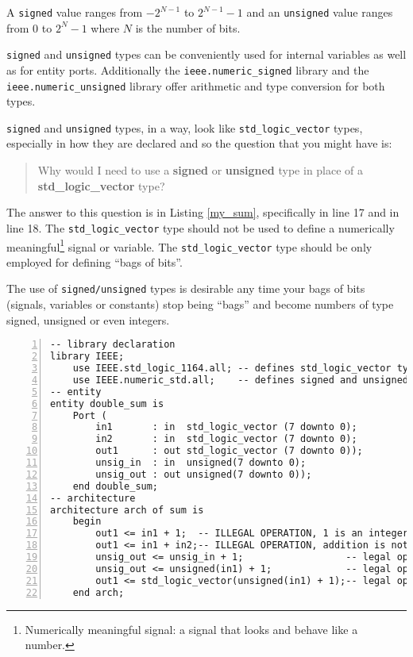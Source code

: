 A \texttt{signed} value ranges from $-2^{N-1}$ to $2^{N-1}-1$ and an \texttt{unsigned} value ranges from $0$ to $2^N-1$ where $N$ is the number of bits.

\texttt{signed} and \texttt{unsigned} types can be conveniently used for internal variables as well as for entity ports. Additionally the \texttt{ieee.numeric\_signed} library and the \texttt{ieee.numeric\_unsigned} library offer arithmetic and type conversion for both types.

\texttt{signed} and \texttt{unsigned} types, in a way, look like \texttt{std\_logic\_vector} types, especially in how they are declared and so the question that you might have is:
\begin{quotation}\ttfamily
Why would I need to use a \textbf{\color{gray}signed} or \textbf{\color{gray}unsigned} type in place of a \textbf{\color{gray}std\_logic\_vector} type?
\end{quotation}
The answer to this question is in Listing \ref{my_sum}, specifically in line 17 and in line 18. The \texttt{std\_logic\_vector} type should not be used to define a numerically meaningful\footnote{Numerically meaningful signal: a signal that looks and behave like a number.} signal or variable. The \texttt{std\_logic\_vector} type should be only employed for defining ``bags of bits''.

The use of \texttt{signed/unsigned} types is desirable any time your bags of bits (signals, variables or constants) stop being ``bags'' and become numbers of type signed, unsigned or even integers.

\noindent
\begin{minipage}{0.99\linewidth}
\begin{lstlisting}[numbers=left, label=my_sum, caption= Use of unsigned types in your code.]
-- library declaration
library IEEE;
    use IEEE.std_logic_1164.all; -- defines std_logic_vector type
    use IEEE.numeric_std.all;    -- defines signed and unsigned types
-- entity
entity double_sum is
    Port (
        in1       : in  std_logic_vector (7 downto 0);
        in2       : in  std_logic_vector (7 downto 0);
        out1      : out std_logic_vector (7 downto 0));
        unsig_in  : in  unsigned(7 downto 0);
        unsig_out : out unsigned(7 downto 0));
    end double_sum;
-- architecture
architecture arch of sum is
    begin
        out1 <= in1 + 1;  -- ILLEGAL OPERATION, 1 is an integer
        out1 <= in1 + in2;-- ILLEGAL OPERATION, addition is not defined
        unsig_out <= unsig_in + 1;                  -- legal operation
        unsig_out <= unsigned(in1) + 1;             -- legal operation
        out1 <= std_logic_vector(unsigned(in1) + 1);-- legal operation
    end arch;
\end{lstlisting}
\end{minipage}

